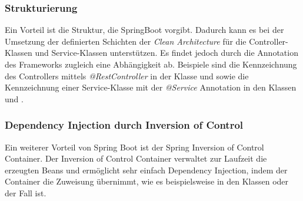 \subsubsection*{Strukturierung}
Ein Vorteil ist die Struktur, die SpringBoot vorgibt.
Dadurch kann es bei der Umsetzung der definierten Schichten der \textit{Clean Architecture} für die Controller-Klassen und Service-Klassen unterstützen.
Es findet jedoch durch die Annotation des Frameworks zugleich eine Abhängigkeit ab.
Beispiele sind die Kennzeichnung des Controllers mittels \textit{@RestController} in der Klasse \href{https://github.com/lucasmerkel/dhbw-advancedswe-programmentwurf/blob/d5c89113d12c3b877ddc4d6a99225b277ddd468f/swe_programmentwurf/consumergoods-inventory-planner/0-cip-plugins/src/main/java/de/dhbw/cip/plugins/rest/ConsumerGoodsGuiController.java#L38}{} und \href{https://github.com/lucasmerkel/dhbw-advancedswe-programmentwurf/blob/d5c89113d12c3b877ddc4d6a99225b277ddd468f/swe_programmentwurf/consumergoods-inventory-planner/0-cip-plugins/src/main/java/de/dhbw/cip/plugins/rest/StorageGuiController.java#L17}{} sowie die Kennzeichnung einer Service-Klasse mit der \textit{@Service} Annotation in den Klassen \href{https://github.com/lucasmerkel/dhbw-advancedswe-programmentwurf/blob/d5c89113d12c3b877ddc4d6a99225b277ddd468f/swe_programmentwurf/consumergoods-inventory-planner/2-cip-application/src/main/java/de/dhbw/cip/application/ConsumerGoodsManager.java#L12}{} und \href{https://github.com/lucasmerkel/dhbw-advancedswe-programmentwurf/blob/d5c89113d12c3b877ddc4d6a99225b277ddd468f/swe_programmentwurf/consumergoods-inventory-planner/2-cip-application/src/main/java/de/dhbw/cip/application/StorageManager.java#L14}{}.

\subsubsection*{Dependency Injection durch Inversion of Control}
Ein weiterer Vorteil von Spring Boot ist der Spring Inversion of Control Container. Der Inversion of Control Container verwaltet zur Laufzeit die erzeugten Beans und ermöglicht sehr einfach Dependency Injection, indem der Container die Zuweisung übernimmt, wie es beispielsweise in den Klassen \href{https://github.com/lucasmerkel/dhbw-advancedswe-programmentwurf/blob/d5c89113d12c3b877ddc4d6a99225b277ddd468f/swe_programmentwurf/consumergoods-inventory-planner/2-cip-application/src/main/java/de/dhbw/cip/application/ConsumerGoodsManager.java#L18}{} oder \href{https://github.com/lucasmerkel/dhbw-advancedswe-programmentwurf/blob/d5c89113d12c3b877ddc4d6a99225b277ddd468f/swe_programmentwurf/consumergoods-inventory-planner/0-cip-plugins/src/main/java/de/dhbw/cip/plugins/rest/ConsumerGoodsGuiController.java#L47}{} der Fall ist.

